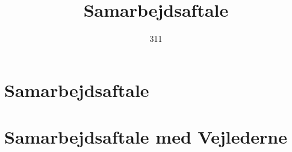 \documentclass{report}
\title{Samarbejdsaftale}
\author{311}
\begin{document}
\maketitle
\tableofcontents
\chapter{Samarbejdsaftale}









%
\chapter{Samarbejdsaftale med Vejlederne}




\end{document}

